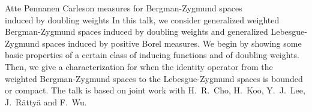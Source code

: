 \talk
{%
    Atte Pennanen
}
{%
    Carleson measures for Bergman-Zygmund spaces\\induced by doubling weights
}
{%
    In this talk, we consider generalized weighted Bergman-Zygmund
    spaces induced by doubling weights and generalized
    Lebesgue-Zygmund spaces induced by positive Borel measures. We
    begin by showing some basic properties of a certain class of
    inducing functions and of doubling weights. Then, we give a
    characterization for when the identity operator from the
    weighted Bergman-Zygmund spaces to the Lebesgue-Zygmund spaces
    is bounded or compact. The talk is based on joint work with
    H.~R.~Cho, H.~Koo, Y.~J.~Lee, J.~Rättyä and F.~Wu.
}
